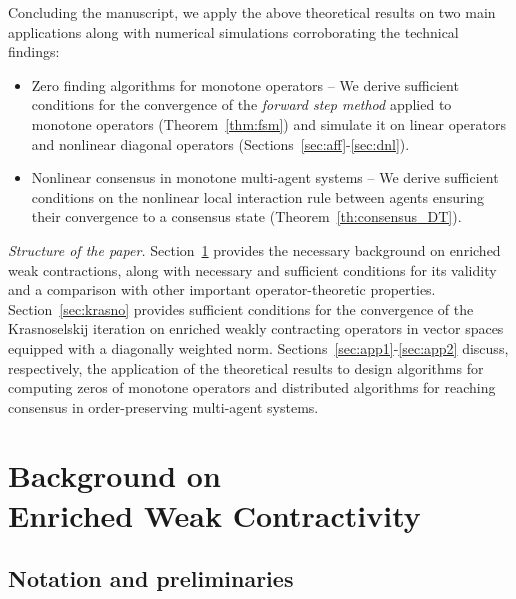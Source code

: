 \documentclass[journal,twoside,web]{ieeecolor}
\begin{document}
%
Concluding the manuscript, we apply the above theoretical results on two main applications along with numerical simulations corroborating the technical findings:
%
\begin{itemize}
    \item Zero finding algorithms for monotone operators -- We derive sufficient conditions for the convergence of the \textit{forward step method} applied to monotone operators (Theorem~\ref{thm:fsm}) and simulate it on linear operators and nonlinear diagonal operators (Sections~\ref{sec:aff}-\ref{sec:dnl}). 
    \item Nonlinear consensus in monotone multi-agent systems -- We derive sufficient conditions on the nonlinear local interaction rule between agents ensuring their convergence to a consensus state (Theorem~\ref{th:consensus_DT}).
\end{itemize}

\textit{Structure of the paper.} 
%
Section~\ref{sec:background} provides the necessary background on enriched weak contractions, along with necessary and sufficient conditions for its validity and a comparison with other important operator-theoretic properties.
%
Section~\ref{sec:krasno} provides sufficient conditions for the convergence of the Krasnoselskij iteration on enriched weakly contracting operators in vector spaces equipped with a diagonally weighted norm.
%
Sections~\ref{sec:app1}-\ref{sec:app2} discuss, respectively, the application of the theoretical results to design algorithms for computing zeros of monotone operators and distributed algorithms for reaching consensus in order-preserving multi-agent systems.

\section{Background on\\ Enriched Weak Contractivity}\label{sec:background}

\subsection{Notation and preliminaries}
\end{document}
